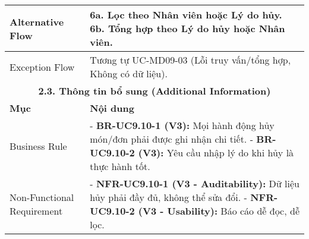 \begin{longtable}{|m{4cm}|p{11cm}|}
\hline
Alternative Flow & \textbf{6a. Lọc theo Nhân viên hoặc Lý do hủy.} \newline \textbf{6b. Tổng hợp theo Lý do hủy hoặc Nhân viên.} \\
\hline
Exception Flow & Tương tự UC-MD09-03 (Lỗi truy vấn/tổng hợp, Không có dữ liệu). \\
\hline
\multicolumn{2}{|c|}{\textbf{2.3. Thông tin bổ sung (Additional Information)}} \\
\hline
\textbf{Mục} & \textbf{Nội dung} \\
\hline
Business Rule & - \textbf{BR-UC9.10-1 (V3):} Mọi hành động hủy món/đơn phải được ghi nhận chi tiết. \newline - \textbf{BR-UC9.10-2 (V3):} Yêu cầu nhập lý do khi hủy là thực hành tốt. \\
\hline
Non-Functional Requirement & - \textbf{NFR-UC9.10-1 (V3 - Auditability):} Dữ liệu hủy phải đầy đủ, không thể sửa đổi. \newline - \textbf{NFR-UC9.10-2 (V3 - Usability):} Báo cáo dễ đọc, dễ lọc. \\
\hline
\end{longtable}

